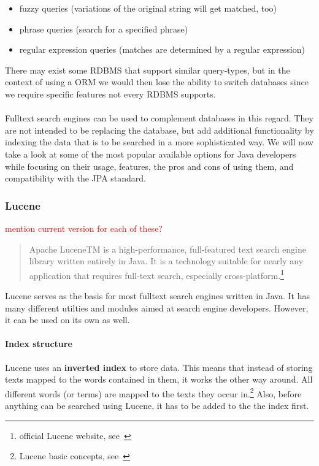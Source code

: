 \begin{itemize}
	\item fuzzy queries (variations of the original string will get matched, too)
	\item phrase queries (search for a specified phrase)
	\item regular expression queries (matches are determined by a regular expression)
\end{itemize}
There may exist some RDBMS that support similar query-types, but in the context of using a ORM we would then lose the ability to switch databases since we require specific features not every RDBMS supports.
\\\\
Fulltext search engines can be used to complement databases in this regard. They are not intended to be replacing the database, but add additional functionality by indexing the data that is to be searched in a more sophisticated way. We will now take a look at some of the most popular available options for Java developers while focusing on their usage, features, the pros and cons of using them, and compatibility with the JPA standard.

\subsubsection{Lucene}

\textcolor{red}{mention current version for each of these?}

\begin{quote}
	Apache LuceneTM is a high-performance, full-featured text search engine library written entirely in Java. It is a technology suitable for nearly any application that requires full-text search, especially cross-platform.\footnote{official Lucene website, see~\cite{lucene_apache_org}}
\end{quote}
Lucene serves as the basis for most fulltext search engines written in Java. It has many different utilties and modules aimed at search engine developers. However, it can be used on its own as well.

\paragraph{Index structure}
Lucene uses an \textbf{inverted index} to store data. This means that instead of storing texts mapped to the words contained in them, it works the other way around. All different words (or terms) are mapped to the texts they occur in.\footnote{Lucene basic concepts, see~\cite{lucene_basic_concepts}} Also, before anything can be searched using Lucene, it has to be added to the the index first.

